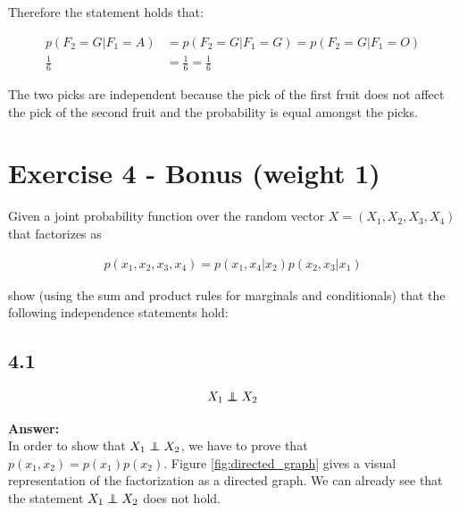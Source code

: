 \documentclass[a4paper]{article}
\newcommand\independent{\protect\mathpalette{\protect\independenT}{\perp}}
\def\independenT#1#2{\mathrel{\rlap{$#1#2$}\mkern2mu{#1#2}}}
\begin{document}
Therefore the statement holds that:

\begin{align*}
p(F_2 = G | F_1 = A) &= p(F_2 = G | F_1 = G) = p(F_2 = G | F_1 = O)\\
\frac{1}{6} &= \frac{1}{6} = \frac{1}{6}
\end{align*}

The two picks are independent because the pick of the first fruit does not affect the pick of the second fruit and the probability is equal amongst the picks.

\section*{Exercise 4 - Bonus (weight 1)}

Given a joint probability function over the random vector $X = (X_1, X_2, X_3, X_4)$ that factorizes as

\begin{align*}
	p(x_1,x_2,x_3,x_4) = p(x_1,x_4|x_2)p(x_2,x_3|x_1)
\end{align*}

show (using the sum and product rules for marginals and conditionals) that the following independence statements hold:

\subsection*{4.1}

\begin{align*}
	X_1 \independent X_2
\end{align*}


\textbf{Answer:}\\

In order to show that $X_1 \independent X_2$, we have to prove that $p(x_1, x_2) = p(x_1)p(x_2)$. Figure \ref{fig:directed_graph} gives a visual representation of the factorization as a directed graph. We can already see that the statement $X_1 \independent X_2$ does not hold.
\end{document}
